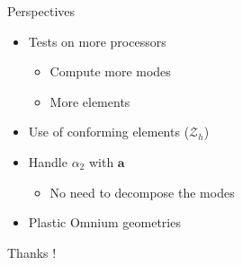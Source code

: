 \documentclass{beamer}
\newcommand{\Z}{{\bm{\mathcal{Z}}}}
\begin{document}
\begin{frame}{Perspectives}
\begin{itemize}
\item Tests on more processors
\begin{itemize}
\item Compute more modes
\item More elements
\end{itemize}
\item Use of conforming elements ($\Z_h$)
\item Handle $\alpha_2$ with $\mathbf{a}$
\begin{itemize}
\item No need to decompose the modes
\end{itemize}
\item Plastic Omnium geometries 
\end{itemize}
\end{frame}

\begin{frame}
\begin{center}
Thanks !
\end{center}
\end{frame}
\end{document}
